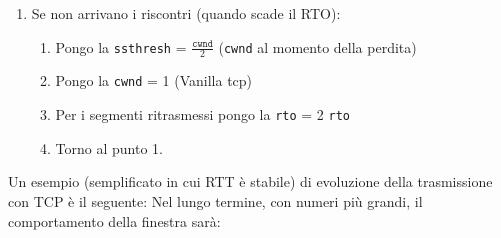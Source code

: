\documentclass[a4paper]{article}
\begin{document}
\begin{itemize}
\begin{enumerate}
      \item Se non arrivano i riscontri (quando scade il RTO):
        \begin{enumerate}
          \item 
            Pongo la \texttt{ssthresh} = \( \frac{\texttt{cwnd}}{2} \) (\texttt{cwnd} al momento della
            perdita)
          \item Pongo la \texttt{cwnd} = 1 (Vanilla tcp)
          \item Per i segmenti ritrasmessi pongo la \texttt{rto} = 2 \texttt{rto} 
          \item Torno al punto 1.
        \end{enumerate}
    \end{enumerate}
\end{itemize}

\begin{example}
  Un esempio (semplificato in cui RTT è stabile) di evoluzione della trasmissione con TCP
  è il seguente:
  \label{07-11-D1}
  Nel lungo termine, con numeri più grandi, il comportamento della finestra sarà:
  \label{07-11-D2}
\end{example}
\end{document}
